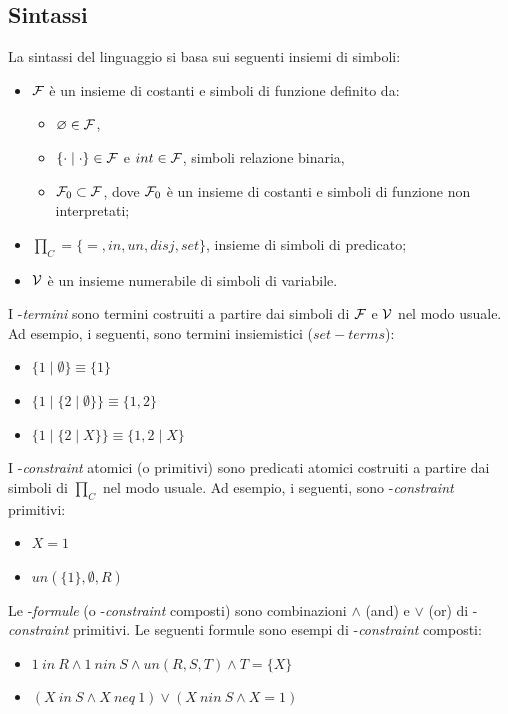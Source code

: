 \documentclass[12pt,a4paper,openright]{book}  %
\begin{document}
\subsection{Sintassi}
\label{subsec:clpbasedlang_lset_sintax}

La sintassi del linguaggio \lset{} si basa sui seguenti insiemi di
simboli:

\begin{itemize}
	\item $\mathcal{F}$ è un insieme di costanti e simboli di funzione
          definito da:
	\begin{itemize}
		\item $\varnothing \in \mathcal{F}$,
		\item $\{ \cdot \mid \cdot \} \in \mathcal{F}$ e $int \in
                  \mathcal{F}$, simboli relazione binaria,
		\item $\mathcal{F}_0 \subset \mathcal{F}$, dove $\mathcal{F}_0$ è un
                  insieme di costanti e simboli di funzione non
                  interpretati;
	\end{itemize}
	\item $\prod_C = \{ =, in, un, disj, set \}$, insieme di
          simboli di predicato;
	\item $\mathcal{V}$ è un insieme numerabile di simboli di variabile.
\end{itemize}

I \calset{}-\textit{termini} sono termini costruiti a partire dai
simboli di $\mathcal{F}$ e $\mathcal{V}$ nel modo usuale. Ad esempio, i seguenti,
sono termini insiemistici ($set-terms$):
\begin{itemize}
	\item $\{1 \mid \emptyset \} \equiv \{1\}$
	\item $\{1 \mid \{2 \mid \emptyset \} \} \equiv \{1,2\}$
	\item $\{1 \mid \{2 \mid X \} \} \equiv \{1,2 \mid X \}$
\end{itemize}

I \calset{}-\textit{constraint} atomici (o primitivi) sono predicati
atomici costruiti a partire dai simboli di $\prod_C$ nel modo
usuale. Ad esempio, i seguenti, sono \calset{}-\textit{constraint}
primitivi:
\begin{itemize}
	\item $X = 1$
	\item $un(\{1\}, \emptyset, R)$
\end{itemize}

Le \calset{}-\textit{formule} (o \calset{}-\textit{constraint}
composti) sono combinazioni $\wedge$ (and) e $\vee$ (or) di
\calset{}-\textit{constraint} primitivi. Le seguenti formule sono
esempi di \calset{}-\textit{constraint} composti:
\begin{itemize}
	\item $1\ in\ R \land 1\ nin\ S \land un(R,S,T) \land T = \{X\}$
	\item $(X\ in\ S \land X\ neq\ 1) \lor (X\ nin\ S \land X = 1)$
\end{itemize}
\end{document}
